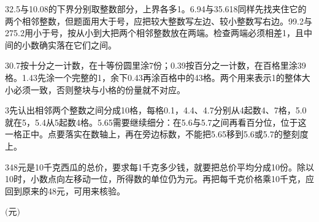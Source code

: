 \documentclass[multi=snippet,border={5bp 20bp 5bp 5bp}]{standalone}
\newenvironment{snippet}[3]{\begin{minipage}{#1bp}\color{answerred}\fontsize{#2}{#3}\selectfont\raggedright}{\end{minipage}}
\begin{document}
\begin{snippet}{505}{11.5}{14}\begin{multicols}{3}\raggedcolumns 2.5与10.08的下界分别取整数部分，上界各多1。6.94与35.618同样先找夹住它的两个相邻整数，但题面用大于号，应把较大整数写左边、较小整数写右边。99.2与275.2用小于号，按从小到大把两个相邻整数放在两端。检查两端必须相差1，且中间的小数确实落在它们之间。\end{multicols}\end{snippet}
\begin{snippet}{505}{11.5}{14}\begin{multicols}{3}\raggedcolumns 0.7按十分之一计数，在十等份圆里涂7份；0.39按百分之一计数，在百格里涂39格。1.43先涂一个完整的1，余下0.43再涂百格中的43格。两个用来表示1的整体大小必须一致，否则整块与小格的份量就不对应。\end{multicols}\end{snippet}
\begin{snippet}{505}{11.5}{14}\begin{multicols}{3}\raggedcolumns 先认出相邻两个整数之间分成10格，每格0.1，4.4、4.7分别从4起数4、7格，5.0就在5，5.4从5起数4格。5.65需要继续细分：在5.6与5.7之间再看百分位，位于这一格正中。点要落实在数轴上，再在旁边标数，不能把5.65移到5.6或5.7的整刻度上。\end{multicols}\end{snippet}
\begin{snippet}{505}{11.5}{14}\begin{multicols}{3}\raggedcolumns 48元是10千克西瓜的总价，要求每1千克多少钱，就要把总价平均分成10份。除以10时，小数点向左移动一位，所得数的单位仍为元。再把每千克价格乘10千克，应回到原来的48元，可用来核验。\end{multicols}\end{snippet}
\begin{snippet}{80}{9.5}{14}\SourceSans\setlength{\mathindent}{2bp}\(\text{(元)}\)\end{snippet}
\end{document}
